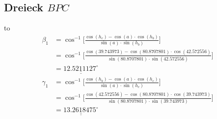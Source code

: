 \subsection{Dreieck $BPC$}
\vspace*{-4mm}
\hbox to
\begin{align*}
\beta_1 &= \cos^{-1}  \bigg[\frac{\cos(h_c)-\cos(a) \cdot \cos(h_b)}{\sin(a) \cdot \sin(h_b)}\bigg] \\
	&= \cos^{-1}  \bigg[\frac{\cos(39.743973)-\cos(80.8707801) \cdot \cos(42.572556)}{\sin(80.8707801) \cdot \sin(42.572556)}\bigg] \\
	&=\underline{\underline{12.5211127^\circ}} 
\\
\gamma_1 &= \cos^{-1}  \bigg[\frac{\cos(h_b)-\cos(a) \cdot \cos(h_c)}{\sin(a) \cdot \sin(h_c)}\bigg] \\
	&= \cos^{-1}  \bigg[\frac{\cos(42.572556)-\cos(80.8707801) \cdot \cos(39.743973)}{\sin(80.8707801) \cdot \sin(39.743973)}\bigg] \\
	&=\underline{\underline{13.2618475^\circ}} 
\end{align*}

